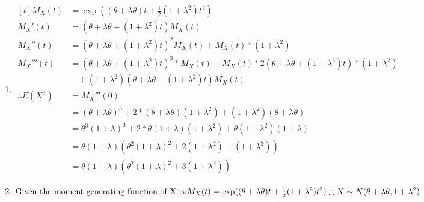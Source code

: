 \documentclass{article}
\begin{document}
\begin{enumerate}
\begin{enumerate}[label=(\roman*)]
    \item $\begin{aligned}[t]
    M_X(t) &= \exp((\theta + \lambda \theta) t + \frac{1}{2} (1 + \lambda^2) t^2) \\
    M_X'(t) &= (\theta + \lambda \theta + (1 + \lambda^2) t) M_X(t) \\
    M_X''(t) &= (\theta + \lambda \theta + (1 + \lambda^2) t)^2 M_X(t) + M_X(t) * (1 + \lambda^2) \\
    M_X'''(t) &= (\theta + \lambda \theta + (1 + \lambda^2) t)^3 * M_X(t) + M_X(t) * 2(\theta + \lambda \theta + (1 + \lambda^2) t) * (1 + \lambda^2) \\
    & \ \ \ \ + (1 + \lambda^2) (\theta + \lambda \theta + (1 + \lambda^2) t) M_X(t) \\
    \therefore E(X^3) &= M_X'''(0) \\
    &= (\theta + \lambda \theta)^3 + 2*(\theta + \lambda \theta)(1 + \lambda^2) + (1 + \lambda^2) (\theta + \lambda \theta) \\
    &= \theta^3 (1 + \lambda)^3 + 2 * \theta (1 + \lambda) (1 + \lambda^2) + \theta (1 + \lambda^2) (1 + \lambda) \\
    &= \theta (1 + \lambda) (\theta^2 (1 + \lambda)^2 + 2(1 + \lambda^2) + (1 + \lambda^2)) \\
    &= \theta (1 + \lambda) (\theta^2 (1 + \lambda)^2 + 3(1 + \lambda^2))
    \end{aligned}$

    \item $
    \text{Given the moment generating function of X is:} \\
    M_X(t) = \exp((\theta + \lambda \theta) t + \frac{1}{2} (1 + \lambda^2) t^2) \\
    \therefore X \sim N(\theta + \lambda \theta, 1 + \lambda^2)
    $
    \end{enumerate}


\end{enumerate}
\end{document}
